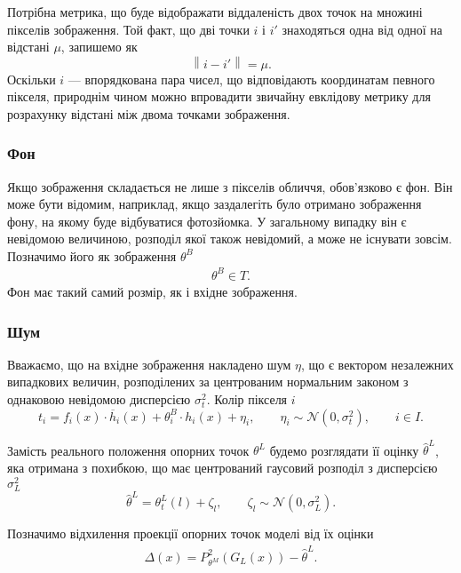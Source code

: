 Потрібна метрика,
що буде відображати віддаленість двох точок на множині пікселів зображення.
Той факт,
що дві точки $i$ і $i'$ знаходяться одна від одної на відстані $\mu$,
запишемо як
\begin{equation*}
  \left\| i - i' \right\| = \mu.
\end{equation*}
Оскільки $i$ --- впорядкована пара чисел,
що відповідають координатам певного пікселя,
природнім чином можно впровадити звичайну евклідову метрику
для розрахунку відстані між двома точками зображення.

\subsubsection{Фон}
Якщо зображення складається не лише з пікселів обличчя,
обов'язково є фон.
Він може бути відомим, наприклад,
якщо заздалегіть було отримано зображення фону,
на якому буде відбуватися фотозйомка.
У загальному випадку він є невідомою величиною,
розподіл якої також невідомий,
а може не існувати зовсім.
Позначимо його як зображення $\theta^B$
\begin{align*}
  \theta^B \in T.
\end{align*}
Фон має такий самий розмір, як і вхідне зображення.

\subsubsection{Шум}

Вважаємо,
що на вхідне зображення накладено шум $\eta$,
що є вектором незалежних випадкових величин,
розподілених за центрованим нормальним законом
з однаковою невідомою дисперсією $\sigma_t^2$.
Колір пікселя $i$
\begin{equation*}
  t_i = f_i\left( x \right) \cdot \overline{h}_i\left( x \right)
    + \theta_i^B \cdot h_i\left( x \right) + \eta_i,\qquad
  \eta_i \sim \mathcal{N}\left( 0, \sigma^2_t\right), \qquad
  i \in I.
\end{equation*}

Замість реального положення опорних точок $\theta^L$
будемо розглядати її оцінку $\hat{\theta}^L$,
яка отримана з похибкою,
що має центрований гаусовий розподіл
з дисперсією $\sigma^2_L$
\begin{equation*}
  \hat{\theta}^L = \theta_t^L\left( l \right) + \zeta_l,
  \qquad \zeta_l \sim \mathcal{N}\left( 0, \sigma_L^2 \right).
\end{equation*}

Позначимо відхилення проекції опорних точок моделі
від їх оцінки
\begin{align*}
  \Delta\left( x \right)
  = P^2_{\theta^M}\left( G_L\left( x \right) \right) - \hat{\theta}^L.
\end{align*}

